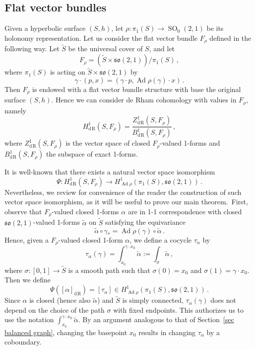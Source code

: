 \documentclass[11pt]{article}
\theoremstyle{definition}
\numberwithin{equation}{section}
\numberwithin{figure}{section}
\numberwithin{table}{section}
\newcommand{\so}{\mathfrak{so}}
\DeclareMathOperator{\Ad}{Ad}
\DeclareMathOperator{\SO}{SO}
\DeclareMathOperator{\rham}{d\! R}
\begin{document}
\subsection{Flat vector bundles}
Given a hyperbolic surface $(S,h)$, let $\rho:\pi_1(S)\to\SO_0(2,1)$ be its holonomy representation. Let us consider the flat vector bundle $F_\rho$ defined in the following way. Let $\widetilde S$ be the universal cover of $S$, and let
\[
F_\rho=\left(\widetilde S\times \so(2,1)\right)/\pi_1(S)\,,
\]
where $\pi_1(S)$ is acting on $\widetilde S\times \so(2,1)$ by
\[
\gamma\cdot (p,x)=(\gamma\cdot p,\Ad\rho(\gamma)\cdot x)\,.
\]
Then $F_\rho$ is endowed with a flat vector bundle structure with base the original surface $(S,h)$. Hence we can consider de Rham cohomology with values in $F_\rho$, namely
\[
H^1_{\rham}(S,F_\rho)=\frac{Z^1_{\rham}(S,F_\rho)}{B^1_{\rham}(S,F_\rho)}\,,
\]
where $Z^1_{\rham}(S,F_\rho)$ is the vector space of closed $F_\rho$-valued 1-forms and $B^1_{\rham}(S,F_\rho)$ the subspace of exact 1-forms.

It is well-known that there exists a natural vector space isomorphism
\[
\Psi:H^1_{\rham}(S,F_\rho)\to H^1_{\Ad\rho}(\pi_1(S),\so(2,1))\,.
\]
Nevertheless, we review for convenience of the reader the construction of such vector space isomorphism, as it will be useful to prove our main theorem.~First, observe that $F_\rho$-valued closed 1-forms $\alpha$ are in 1-1 correspondence with closed $\so(2,1)$-valued 1-forms $\widetilde \alpha$ on $\widetilde S$ satisfying the equivariance
\begin{equation}\label{eq equivariance 1-form}
\widetilde \alpha\circ \gamma_*=\Ad\rho(\gamma)\circ \widetilde\alpha\,.
\end{equation}
Hence, given a $F_\rho$-valued closed 1-form $\alpha$, we define a cocycle $\tau_\alpha$ by
\[
\tau_\alpha(\gamma)=\int_{x_0}^{\gamma\cdot x_0}\widetilde\alpha:=\int_\sigma \widetilde\alpha\,,
\]
where $\sigma:[0,1]\to\widetilde S$ is a smooth path such that $\sigma(0)=x_0$ and $\sigma(1)=\gamma\cdot x_0$. Then we define
\[
\Psi([\alpha]_{\rham})=[\tau_\alpha]\in H^1_{\Ad\rho}(\pi_1(S),\so(2,1))\,.
\]
Since $\alpha$ is closed (hence also $\widetilde \alpha$) and $\widetilde S$ is simply connected, $\tau_\alpha(\gamma)$ does not depend on the choice of the path $\sigma$ with fixed endpoints. This authorizes us to use the notation $\int_{x_0}^{\gamma\cdot x_0}\widetilde\alpha$. By an argument analogous to that of Section~\ref{sec balanced graph}, changing the basepoint $x_0$ results in changing $\tau_\alpha$ by a coboundary.
\end{document}
